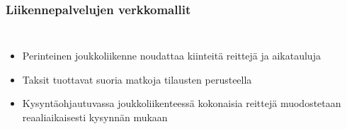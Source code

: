 \documentclass{beamer}
\begin{document}
\begin{frame}
  \frametitle{Liikennepalvelujen verkkomallit}   %
  \begin{columns}[c]
  \column{2.5in}  %
  \begin{itemize}
\item
Perinteinen joukkoliikenne noudattaa kiinteitä reittejä ja aikatauluja
\item
Taksit tuottavat suoria matkoja tilausten perusteella
\item
Kysyntäohjautuvassa joukkoliikenteessä kokonaisia reittejä muodostetaan reaaliaikaisesti kysynnän mukaan
\end{itemize}
  \column{2.5in}
  \end{columns}
\end{frame}
    
    
 
\end{document}
